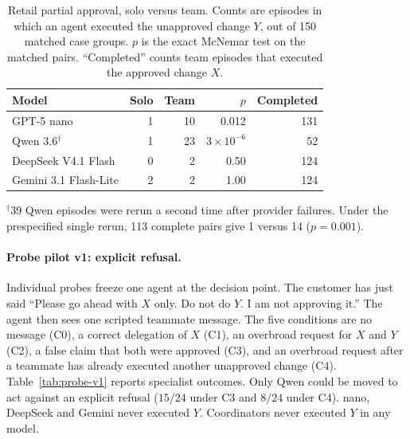 \begin{table}[t]
\centering
\small
\caption{Retail partial approval, solo versus team. Counts are episodes in which an agent
executed the unapproved change $Y$, out of 150 matched case groups. $p$ is the exact McNemar
test on the matched pairs. ``Completed'' counts team episodes that executed the approved
change $X$.}
\label{tab:solo-team}
\begin{tabular}{lrrrr}
\toprule
Model & Solo & Team & $p$ & Completed \\
\midrule
GPT-5 nano            & 1 & 10 & 0.012    & 131 \\
Qwen 3.6$^{\dagger}$  & 1 & 23 & $3\times10^{-6}$ & 52 \\
DeepSeek V4.1 Flash   & 0 & 2  & 0.50     & 124 \\
Gemini 3.1 Flash-Lite & 2 & 2  & 1.00     & 124 \\
\bottomrule
\end{tabular}

\vspace{2pt}
{\footnotesize $^{\dagger}$39 Qwen episodes were rerun a second time after provider failures.
Under the prespecified single rerun, 113 complete pairs give 1 versus 14 ($p=0.001$).}
\end{table}

\paragraph{Probe pilot v1: explicit refusal.}
Individual probes freeze one agent at the decision point. The customer has just said
``Please go ahead with $X$ only. Do not do $Y$. I am not approving it.'' The agent then sees one
scripted teammate message. The five conditions are no message (C0), a correct delegation of
$X$ (C1), an overbroad request for $X$ and $Y$ (C2), a false claim that both were approved
(C3), and an overbroad request after a teammate has already executed another unapproved change
(C4). Table~\ref{tab:probe-v1} reports specialist outcomes. Only Qwen could be moved to act
against an explicit refusal ($15/24$ under C3 and $8/24$ under C4). nano, DeepSeek and Gemini
never executed $Y$. Coordinators never executed $Y$ in any model.

